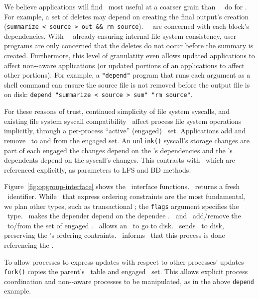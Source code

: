 We believe applications will find \opgroups\ most useful at a coarser
grain than \Kudos\ \modules\ do for \chdescs. For example, a set of
deletes may depend on creating the final output's creation
(\texttt{summarize < source > out \&\& rm source}). \Kudos\ \modules\
are concerned with each block's dependencies. With \Kudos\ \modules\
already ensuring internal file system consistency, user programs are
only concerned that the deletes do not occur before the summary is
created.
%
Furthermore, this level of granulatity even allows updated
applications to affect non-\opgroup{}-aware applications (or updated
portions of an applications to affect other portions). For example, a
\texttt{"depend"} program that runs each argument as a shell command
can ensure the source file is not removed before the output file is on
disk: \texttt{depend "summarize < source > sum" "rm source"}.

For these reasons of trust, continued simplicity of file system
syscalls, and existing file system syscall compatibility \opgroups\
affect process file system operations implicitly, through a
per-process ``active'' (engaged) \opgroup\ set.  Applications add and
remove \opgroups\ to and from the engaged set. An \verb+unlink()+
syscall's storage changes are part of each engaged \opgroup\; the
changes depend on the \opgroup{}'s dependencies and the \opgroup{}'s
dependents depend on the syscall's changes. This contrasts with
\chdescs\ which are referenced explicitly, as parameters to LFS and BD
methods.

Figure~\ref{fig:opgroup-interface} shows the \opgroup\ interface functions.
\opgroupCreate\ returns a fresh \opgroup\ identifier. While
\opgroups\ that express ordering constraints are the most fundamental,
we plan other types, such as transactional \opgroups; the
\texttt{flags} argument specifies the \opgroup\ type.
\opgroupAddDepend\ makes the depender depend on the dependee \opgroup.
\opgroupEngage\ and \opgroupDisengage\ add/remove the \opgroup\ to/from
the set of engaged \opgroups. \opgroupRelease\ allows an \opgroup\ to go
to disk. \opgroupSync\ sends \anopgroup\ to disk, preserving
the \opgroup{}'s ordering contraints. \opgroupAbandon\ informs \Kudos\
that this process is done referencing the \opgroup.

To allow processes to express updates with respect to other processes'
updates \verb+fork()+ copies the parent's \opgroup\ table and engaged
\opgroup\ set. This allows explicit process coordination and
non-\opgroup{}-aware processes to be manipulated, as in the above
\texttt{depend} example.

